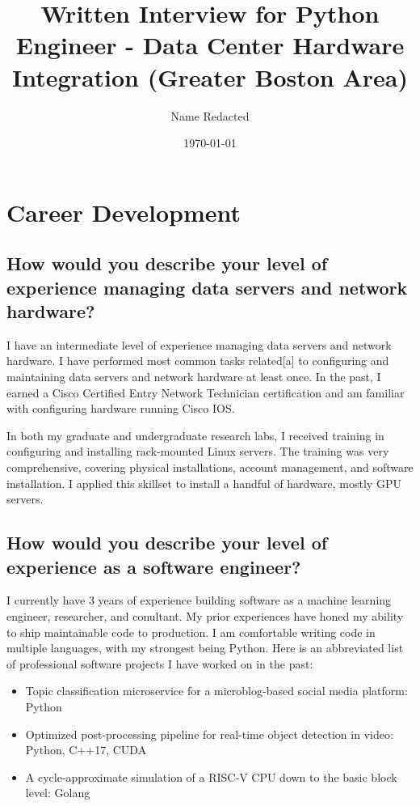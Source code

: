 \documentclass{article}
\title{Written Interview for Python Engineer - Data Center Hardware Integration (Greater Boston Area)}
\author{Name Redacted}
\date{\today}
\begin{document}
\maketitle

\section{Career Development}
\subsection{How would you describe your level of experience managing data servers and network hardware?}

I have an intermediate level of experience managing data servers and network
hardware. I have performed most common tasks related[a] to configuring and
maintaining data servers and network hardware at least once. In the past, I
earned a Cisco Certified Entry Network Technician certification and am familiar
with configuring hardware running Cisco IOS.

In both my graduate and undergraduate research labs, I received training in
configuring and installing rack-mounted Linux servers. The training was very
comprehensive, covering physical installations, account management, and software
installation. I applied this skillset to install a handful of hardware, mostly
GPU servers.

\subsection{How would you describe your level of experience as a software
  engineer?}

I currently have 3 years of experience building software as a machine learning
engineer, researcher, and conultant. My prior experiences  have honed my ability
to ship maintainable code to production. I am comfortable writing code in
multiple languages, with my strongest being Python. Here is an abbreviated list
of professional software projects I have worked on in the past:

\begin{itemize}
  \item Topic classification microservice for a microblog-based social media platform: Python
  \item Optimized post-processing pipeline for real-time object detection in video: Python, C++17, CUDA
  \item A cycle-approximate simulation of a RISC-V CPU down to the basic block level: Golang
\end{itemize}
\end{document}
